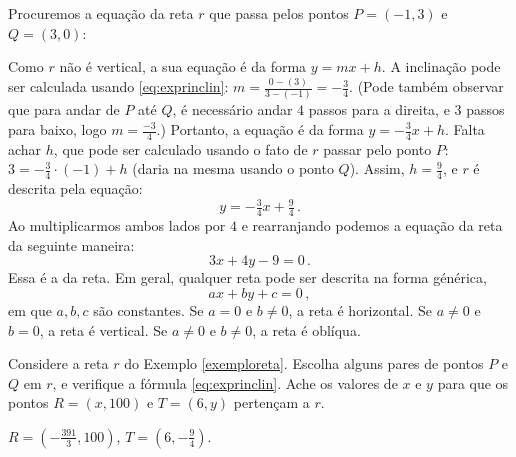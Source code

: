 \begin{ex}\label{exemploreta}
 Procuremos a equação da reta $r$ que passa pelos pontos $P=(-1,3)$ e $Q=(3,0)$:
\begin{center}
\begin{bmlimage}\end{bmlimage}
\end{center}
Como $r$ não é vertical, a sua equação é da forma $y=mx+h$. A 
inclinação pode ser
calculada usando \eqref{eq:exprinclin}:
$m=\frac{0-(3)}{3-(-1)}=-\frac{3}{4}$.
 (Pode também observar que para andar de $P$ até $Q$, é necessário andar 
$4$ passos para a
direita, e $3$ passos para baixo, logo $m=\tfrac{-3}{4}$.)
 Portanto, a equação é da forma $y=-\tfrac{3}{4}x+h$. Falta achar $h$, 
que pode ser
calculado usando o fato de $r$ passar pelo ponto $P$: 
$3=-\tfrac{3}{4}\cdot (-1)+h$ (daria
na mesma usando o ponto $Q$). 
Assim, $h=\tfrac{9}{4}$, e $r$ é descrita pela equação: $$y=-\tfrac{3}{4}x+\tfrac94\,.$$
 Ao multiplicarmos ambos lados por $4$ e rearranjando podemos a equação da reta
 da seguinte maneira:
$$
3x+4y-9=0\,.
$$
Essa é a  da reta. 
Em geral, qualquer reta pode ser
descrita na forma  générica,
\[
ax+by+c=0\,,
\]
em que $a,b,c$ são constantes. Se $a=0$ e $b\neq 0$, a reta é horizontal. Se
$a\neq 0$ e $b=0$, a reta é vertical. Se $a\neq 0$ e $b\neq 0$, a reta é oblíqua.

\end{ex}

\begin{exo}
Considere a reta $r$ do Exemplo \ref{exemploreta}.
Escolha alguns pares de pontos $P$ e $Q$ em $r$, 
e verifique a fórmula \eqref{eq:exprinclin}.
Ache os valores de $x$ e $y$ para que os pontos $R=(x,100)$ e $T=(6,y)$ pertençam a $r$.
\begin{sol}
$R=(-\frac{391}{3},100)$, $T=(6,-\frac{9}{4})$.
\end{sol}
\end{exo}

